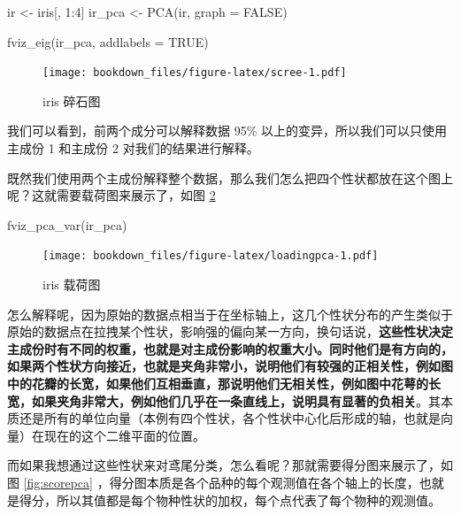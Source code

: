 \documentclass[
]{krantz}
\makeatletter
\newenvironment{Shaded}{\begin{snugshade}}{\end{snugshade}}
\newcommand{\AttributeTok}[1]{\textcolor[rgb]{0.77,0.63,0.00}{#1}}
\newcommand{\ConstantTok}[1]{\textcolor[rgb]{0.00,0.00,0.00}{#1}}
\newcommand{\DecValTok}[1]{\textcolor[rgb]{0.00,0.00,0.81}{#1}}
\newcommand{\FunctionTok}[1]{\textcolor[rgb]{0.00,0.00,0.00}{#1}}
\newcommand{\NormalTok}[1]{#1}
\newcommand{\OtherTok}[1]{\textcolor[rgb]{0.56,0.35,0.01}{#1}}
\newcommand{\SpecialCharTok}[1]{\textcolor[rgb]{0.00,0.00,0.00}{#1}}
\newenvironment{kframe}{%
\medskip{}
\setlength{\fboxsep}{.8em}
 \def\at@end@of@kframe{}%
 \ifinner\ifhmode%
  \def\at@end@of@kframe{\end{minipage}}%
  \begin{minipage}{\columnwidth}%
 \fi\fi%
 \def\FrameCommand##1{\hskip\@totalleftmargin \hskip-\fboxsep
 \colorbox{shadecolor}{##1}\hskip-\fboxsep
     \hskip-\linewidth \hskip-\@totalleftmargin \hskip\columnwidth}%
 \MakeFramed {\advance\hsize-\width
   \@totalleftmargin\z@ \linewidth\hsize
   \@setminipage}}%
 {\par\unskip\endMakeFramed%
 \at@end@of@kframe}
\renewenvironment{Shaded}{\begin{kframe}}{\end{kframe}}
\makeatother
\begin{document}
\begin{Shaded}
\begin{Highlighting}[]
\NormalTok{ir }\OtherTok{\textless{}{-}}\NormalTok{ iris[, }\DecValTok{1}\SpecialCharTok{:}\DecValTok{4}\NormalTok{]}
\NormalTok{ir\_pca }\OtherTok{\textless{}{-}} \FunctionTok{PCA}\NormalTok{(ir, }\AttributeTok{graph =} \ConstantTok{FALSE}\NormalTok{)}

\FunctionTok{fviz\_eig}\NormalTok{(ir\_pca, }\AttributeTok{addlabels =} \ConstantTok{TRUE}\NormalTok{)}
\end{Highlighting}
\end{Shaded}

\begin{figure}
\centering
\texttt{[image: bookdown\_files/figure-latex/scree-1.pdf]}
\caption{\label{fig:scree}iris 碎石图}
\end{figure}

我们可以看到，前两个成分可以解释数据 95\% 以上的变异，所以我们可以只使用主成份 1 和主成份 2 对我们的结果进行解释。

既然我们使用两个主成份解释整个数据，那么我们怎么把四个性状都放在这个图上呢？这就需要载荷图来展示了，如图 \ref{fig:loadingpca}

\begin{Shaded}
\begin{Highlighting}[]
\FunctionTok{fviz\_pca\_var}\NormalTok{(ir\_pca)}
\end{Highlighting}
\end{Shaded}

\begin{figure}
\centering
\texttt{[image: bookdown\_files/figure-latex/loadingpca-1.pdf]}
\caption{\label{fig:loadingpca}iris 载荷图}
\end{figure}

怎么解释呢，因为原始的数据点相当于在坐标轴上，这几个性状分布的产生类似于原始的数据点在拉拽某个性状，影响强的偏向某一方向，换句话说，\textbf{这些性状决定主成份时有不同的权重，也就是对主成份影响的权重大小。同时他们是有方向的，如果两个性状方向接近，也就是夹角非常小，说明他们有较强的正相关性，例如图中的花瓣的长宽，如果他们互相垂直，那说明他们无相关性，例如图中花萼的长宽，如果夹角非常大，例如他们几乎在一条直线上，说明具有显著的负相关}。其本质还是所有的单位向量（本例有四个性状，各个性状中心化后形成的轴，也就是向量）在现在的这个二维平面的位置。

而如果我想通过这些性状来对鸢尾分类，怎么看呢？那就需要得分图来展示了，如图 \ref{fig:scorepca} ，得分图本质是各个品种的每个观测值在各个轴上的长度，也就是得分，所以其值都是每个物种性状的加权，每个点代表了每个物种的观测值。
\end{document}
